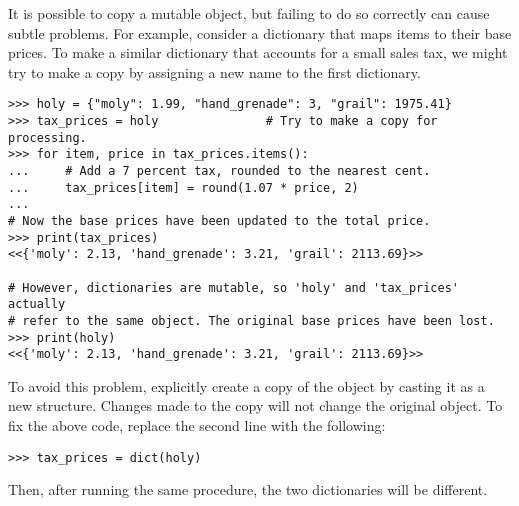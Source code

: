 \begin{warn} %
It is possible to copy a mutable object, but failing to do so correctly can cause subtle problems.
For example, consider a dictionary that maps items to their base prices.
To make a similar dictionary that accounts for a small sales tax, we might try to make a copy by assigning a new name to the first dictionary.

\begin{lstlisting}
>>> holy = {"moly": 1.99, "hand_grenade": 3, "grail": 1975.41}
>>> tax_prices = holy               # Try to make a copy for processing.
>>> for item, price in tax_prices.items():
...     # Add a 7 percent tax, rounded to the nearest cent.
...     tax_prices[item] = round(1.07 * price, 2)
...
# Now the base prices have been updated to the total price.
>>> print(tax_prices)
<<{'moly': 2.13, 'hand_grenade': 3.21, 'grail': 2113.69}>>

# However, dictionaries are mutable, so 'holy' and 'tax_prices' actually
# refer to the same object. The original base prices have been lost.
>>> print(holy)
<<{'moly': 2.13, 'hand_grenade': 3.21, 'grail': 2113.69}>>
\end{lstlisting}

To avoid this problem, explicitly create a copy of the object by casting it as a new structure.
Changes made to the copy will not change the original object.
To fix the above code, replace the second line with the following:

\begin{lstlisting}
>>> tax_prices = dict(holy)
\end{lstlisting}
Then, after running the same procedure, the two dictionaries will be different.

\end{warn}

